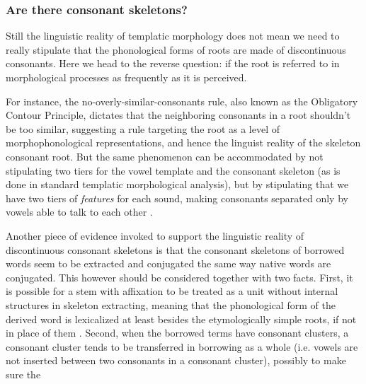 \documentclass[a4paper, oneside, 12pt]{report}
\newcommand*{\citepage}[1]{p.~{#1}}
\begin{document}
\subsubsection{Are there consonant skeletons?}

Still the linguistic reality of templatic morphology
does not mean we need to really stipulate that the phonological forms of roots
are made of discontinuous consonants.
Here we head to the reverse question: if the root is referred to in morphological processes
as frequently as it is perceived.

For instance, the no-overly-similar-consonants rule,
also known as the Obligatory Contour Principle,
dictates that the neighboring consonants in a root shouldn't be too similar,
suggesting a rule targeting the root as a level of morphophonological representations,
and hence the linguist reality of the skeleton consonant root.
But the same phenomenon can be accommodated by
not stipulating two tiers for the vowel template and the consonant skeleton
(as is done in standard templatic morphological analysis),
but by stipulating that we have two tiers of \emph{features} for each sound,
making consonants separated only by vowels able to talk to each other \citep{bat20082}. 

Another piece of evidence invoked to support the linguistic reality of discontinuous consonant skeletons
is that the consonant skeletons of borrowed words seem to be 
extracted and conjugated the same way native words are conjugated.
This however should be considered together with two facts.
First, it is possible for a stem with affixation to be treated as
a unit without internal structures in skeleton extracting,
meaning that the phonological form of the derived word is lexicalized
at least besides the etymologically simple roots, 
if not in place of them \citep[\citepage{132}]{bolozky2008roots}.
Second, when the borrowed terms have consonant clusters,
a consonant cluster tends to be transferred in borrowing as a whole
(i.e. vowels are not inserted between two consonants in a consonant cluster),
possibly to make sure the 
\end{document}
